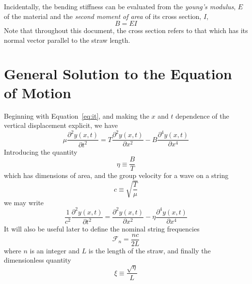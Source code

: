 \documentclass[twoside]{article}
\begin{document}
\begin{multicols}{2}
Incidentally, the bending stiffness can be evaluated from the \emph{young's modulus}, $E$ of the material and the \emph{second moment of area} of its cross section, $I$,
\begin{equation}
B = E I
\end{equation}
Note that throughout this document, the cross section refers to that which has its normal vector parallel to the straw length.


\section{General Solution to the Equation of Motion}
Beginning with Equation~\ref{eq:it}, and making the $x$ and $t$ dependence of the vertical displacement explicit, we have 
\begin{equation}
\mu \frac{\partial^2y(x,t)}{\partial t^2} = T \frac{\partial^2y(x,t)}{\partial x^2} - B \frac{\partial^4y(x,t)}{\partial x^4}
\end{equation}
Introducing the quantity
\begin{equation}
\eta  \equiv \frac{B}{T}
\end{equation}
which has dimensions of area, and the group velocity for a wave on a string
\begin{equation}
c  \equiv \sqrt{\frac{T}{\mu}}
\end{equation}
we may write
\begin{equation}
\frac{1}{c^2} \frac{\partial^2y(x,t)}{\partial t^2} = \frac{\partial^2y(x,t)}{\partial x^2} - \eta \frac{\partial^4y(x,t)}{\partial x^4}
\label{eq:mot}
\end{equation}
It will also be useful later to define the nominal string frequencies
\begin{equation}
	\mathcal{F}_n = \frac{nc}{2L}
\end{equation}
where $n$ is an integer and $L$ is the length of the straw, and finally the dimensionless quantity
\begin{equation}
\xi  \equiv \frac{\sqrt{\eta}}{L}
\label{eq:xi}
\end{equation}


\end{multicols}
\end{document}
